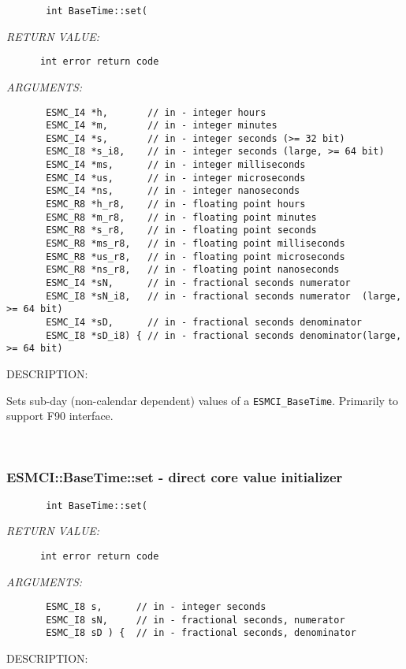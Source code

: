   
\begin{verbatim}       int BaseTime::set(\end{verbatim}{\em RETURN VALUE:}
\begin{verbatim}      int error return code\end{verbatim}{\em ARGUMENTS:}
\begin{verbatim}       ESMC_I4 *h,       // in - integer hours
       ESMC_I4 *m,       // in - integer minutes
       ESMC_I4 *s,       // in - integer seconds (>= 32 bit)
       ESMC_I8 *s_i8,    // in - integer seconds (large, >= 64 bit)
       ESMC_I4 *ms,      // in - integer milliseconds
       ESMC_I4 *us,      // in - integer microseconds
       ESMC_I4 *ns,      // in - integer nanoseconds
       ESMC_R8 *h_r8,    // in - floating point hours
       ESMC_R8 *m_r8,    // in - floating point minutes
       ESMC_R8 *s_r8,    // in - floating point seconds
       ESMC_R8 *ms_r8,   // in - floating point milliseconds
       ESMC_R8 *us_r8,   // in - floating point microseconds
       ESMC_R8 *ns_r8,   // in - floating point nanoseconds
       ESMC_I4 *sN,      // in - fractional seconds numerator
       ESMC_I8 *sN_i8,   // in - fractional seconds numerator  (large, >= 64 bit)
       ESMC_I4 *sD,      // in - fractional seconds denominator
       ESMC_I8 *sD_i8) { // in - fractional seconds denominator(large, >= 64 bit)\end{verbatim}
{\sf DESCRIPTION:\\ }


        Sets sub-day (non-calendar dependent) values of a {\tt ESMCI\_BaseTime}.
        Primarily to support F90 interface.
   
 
\mbox{}\hrulefill\ 
 
\subsubsection [ESMCI::BaseTime::set] {ESMCI::BaseTime::set - direct core value initializer}


  
\begin{verbatim}       int BaseTime::set(\end{verbatim}{\em RETURN VALUE:}
\begin{verbatim}      int error return code\end{verbatim}{\em ARGUMENTS:}
\begin{verbatim}       ESMC_I8 s,      // in - integer seconds
       ESMC_I8 sN,     // in - fractional seconds, numerator
       ESMC_I8 sD ) {  // in - fractional seconds, denominator\end{verbatim}
{\sf DESCRIPTION:\\ }


